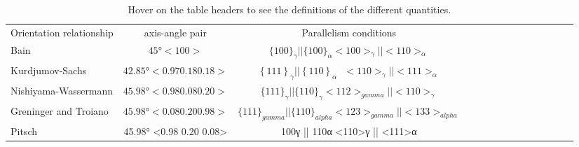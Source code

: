 
\begin{table*}
\caption{Hover on the table headers to see the definitions of the  different quantities.}
\label{table}
\begin{tabular}{l c | c c c c c c  c c c c c c}
\hline\hline
    Orientation relationship & axis-angle pair & Parallelism conditions \\
    Bain \cite{bain1924nature} & \(45°<100>\) & $\{100\}_{\gamma} || \{100\}_{\alpha} <100>_{\gamma } || <110>_{\alpha}$ \\
    Kurdjumov-Sachs \cite{kurdjumow1930mechanismus} & \(42.85°<0.970.180.18>\) & $\left\{111\right\}_{\gamma}||\left\{110\right\}_{\alpha}\ \ \ <110>_{\gamma}||<111>_{\alpha}$ \\
    Nishiyama-Wassermann\cite{nishiyama1934x,wassermann1935ueber} & $45.98° <0.98 0.08 0.20>$ & $\{111\}_{\gamma} || \{110\}_{\gamma} <112>_{gamma} || <110>_{\gamma}$ \\
    Greninger and Troiano\cite{greninger1949mechanism} & $45.98° <0.08 0.20 0.98>$ & $\{111\}_{gamma} || \{110\}_{alpha} <123>_{gamma} || <133>_{alpha}$ \\
    Pitsch & 45.98° <0.98 0.20 0.08> & {100}γ || {110}α <110>γ || <111>α \\
\hline
\end{tabular}
\end{table*}
